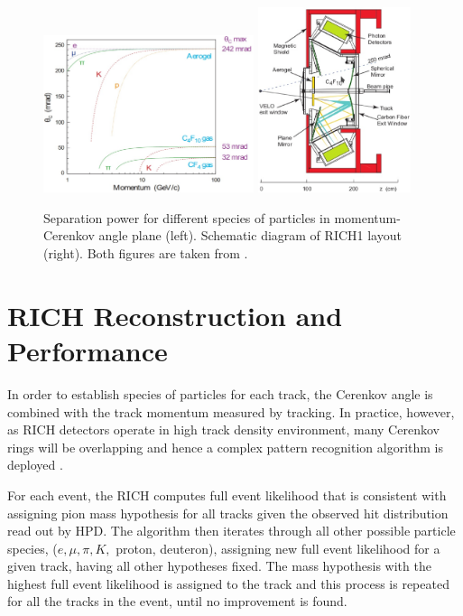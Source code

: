 \begin{figure}[!h]
	\centering
	\includegraphics[width = 0.55\textwidth]{figs/detector/richres1.eps}%
	\includegraphics[width = 0.4\textwidth]{figs/detector/mechrich.eps}%
	\caption{Separation power for different species of particles in momentum-Cerenkov angle plane (left). Schematic diagram of \gls{RICH1} layout (right). Both figures are taken from \cite{det_paper}.}
	\label{fig:richres}
\end{figure}

\section{RICH Reconstruction and Performance }
In order to establish species of particles for each track, the Cerenkov angle is combined with the track momentum measured by tracking. In practice, however, as \Gls{RICH} detectors operate in high track density environment, many Cerenkov rings will be overlapping and hence a complex pattern recognition algorithm is deployed \cite{Forty:1999sg}. 


For each event, the \Gls{RICH} computes full event likelihood that is consistent with assigning pion mass hypothesis for all tracks given the observed hit distribution read out by \Gls{HPD}. The algorithm then iterates through all other possible particle species, ($e, \mu, \pi, K,$ proton, deuteron), assigning new full event likelihood for a given track, having all other hypotheses fixed. The mass hypothesis with the highest full event likelihood is assigned to the track and this process is repeated for all the tracks in the event, until no improvement is found. 


